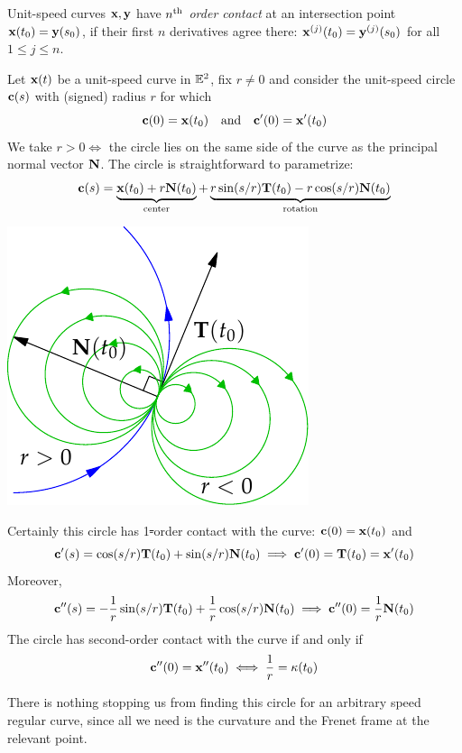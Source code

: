 \begin{defn}{}{}
Unit-speed curves ${\mathbf{x}},{\mathbf{y}}$ have \emph{$n\textsuperscript{th}$ order contact} at an intersection point ${\mathbf{x}}(t_0)={\mathbf{y}}(s_0)$, if their first $n$ derivatives agree there: ${\mathbf{x}}^{(j)}(t_0)={\mathbf{y}}^{(j)}(s_0)$ for all $1\le j\le n$.
\end{defn}

\begin{minipage}[t]{0.65\linewidth}\vspace{0pt}
Let ${\mathbf{x}}(t)$ be a unit-speed curve in $\mathbb{E}^2$, fix $r\neq 0$ and consider the unit-speed circle ${\mathbf{c}}(s)$ with (signed) radius $r$ for which
\[{\mathbf{c}}(0)={\mathbf{x}}(t_0)\quad\text{and}\quad{\mathbf{c}}'(0)={\mathbf{x}}'(t_0)\]
We take $r>0\iff$ the circle lies on the same side of the curve as the principal normal vector ${\mathbf{N}}$.\medbreak
The circle is straightforward to parametrize:
\[{\mathbf{c}}(s)=\underbrace{{\mathbf{x}}(t_0)+r{\mathbf{N}}(t_0)}_{\text{center}} +\underbrace{r\sin(s/r){\mathbf{T}}(t_0)-r\cos(s/r){\mathbf{N}}(t_0)}_{\text{rotation}}\]
\end{minipage}\hfill\begin{minipage}[t]{0.34\linewidth}\vspace{0pt}
\flushright\includegraphics[scale=0.9]{radii-circles}
\end{minipage}\medbreak
Certainly this circle has 1\st-order contact with the curve: ${\mathbf{c}}(0)={\mathbf{x}}(t_0)$ and 
\[{\mathbf{c}}'(s)=\cos(s/r){\mathbf{T}}(t_0)+\sin(s/r){\mathbf{N}}(t_0)\implies {\mathbf{c}}'(0)={\mathbf{T}}(t_0)={\mathbf{x}}'(t_0)\]
Moreover,
\[{\mathbf{c}}''(s)=-\frac 1r\sin(s/r){\mathbf{T}}(t_0)+\frac 1r\cos(s/r){\mathbf{N}}(t_0)\implies {\mathbf{c}}''(0)=\frac 1r{\mathbf{N}}(t_0)\]
The circle has second-order contact with the curve if and only if
\[{\mathbf{c}}''(0)={\mathbf{x}}''(t_0)\iff \frac 1r=\kappa(t_0)\]


There is nothing stopping us from finding this circle for an arbitrary speed regular curve, since all we need is the curvature and the Frenet frame at the relevant point.

